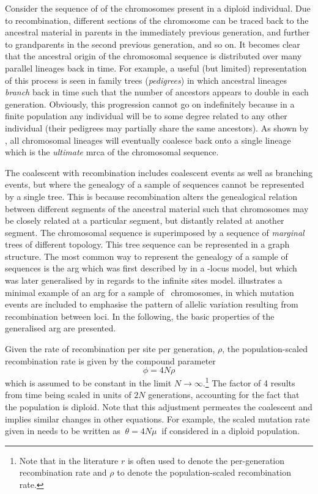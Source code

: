 Consider the sequence of  of the chromosomes present in a diploid individual.
Due to recombination, different sections of the chromosome can be traced back to the ancestral material in  parents in the immediately previous generation, and further to  grandparents in the second previous generation, and so on.
It becomes clear that the ancestral origin of the chromosomal sequence is distributed over many parallel lineages back in time.
For example, a useful (but limited) representation of this process is seen in family trees (\emph{pedigrees}) in which ancestral lineages \emph{branch} back in time such that the number of ancestors appears to double in each generation.
Obviously, this progression cannot go on indefinitely because in a finite population any individual will be to some degree related to any other individual (their pedigrees may partially share the same ancestors).
As shown by \citet{Wiuf:1997wf}, all chromosomal lineages will eventually coalesce back onto a single lineage which is the \emph{ultimate} \gls{mrca} of the chromosomal sequence.

The coalescent with recombination includes coalescent events as well as branching events, but where the genealogy of a sample of sequences cannot be represented by a single tree.
This is because recombination alters the genealogical relation between different segments of the ancestral material such that  chromosomes may be closely related at a particular segment, but distantly related at another segment.
The chromosomal sequence is superimposed by a sequence of \emph{marginal} trees of different topology.
This tree sequence can be represented in a graph structure.
The most common way to represent the genealogy of a sample of sequences is the \gls{arg} which was first described by \citet{Griffiths:1991jp} in a -locus model, but which was later generalised by \citet{Griffiths:1996dx,griffiths1997} in regards to the infinite sites model.
 illustrates a minimal example of an \gls{arg} for a sample of ~chromosomes, in which mutation events are included to emphasise the pattern of allelic variation resulting from recombination between  loci.
In the following, the basic properties of the generalised \gls{arg} are presented.

%

%

Given the rate of recombination per site per generation, $\rho$, the population-scaled recombination rate is given by the compound parameter
\begin{equation}\label{eq:recrate}
	\phi = 4 N \rho
\end{equation}
which is assumed to be constant in the limit ${N\rightarrow\infty}$.\footnote{Note that in the literature $r$ is often used to denote the per-generation recombination rate and $\rho$ to denote the population-scaled recombination rate.}
The factor of 4 results from time being scaled in units of ${2 N}$ generations, accounting for the fact that the population is diploid.
Note that this adjustment permeates the coalescent and implies similar changes in other equations.
For example, the scaled mutation rate given in  needs to be written as $~{\theta = 4 N \mu}~$ if considered in a diploid population.

